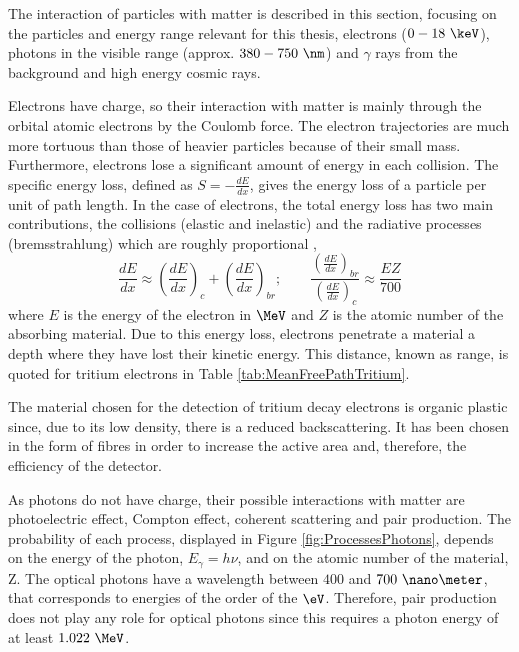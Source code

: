 The interaction of particles with matter is described in this section, focusing on the particles and energy range relevant for this thesis, electrons ($0-18~\keV$), photons in the visible range (approx. $380-750~\nm$) and $\gamma$ rays from the background and high energy cosmic rays.

Electrons have charge, so their interaction with matter is mainly through the orbital atomic  electrons by the Coulomb force. The electron trajectories are much more tortuous than those of heavier particles because of their small mass. Furthermore, electrons lose a significant amount of energy in each collision. The specific energy loss, defined as $S=-\displaystyle{\frac{dE}{dx}}$, gives the energy loss of a particle per unit of path length. In the case of electrons, the total energy loss has two main contributions, the collisions (elastic and inelastic) and the radiative processes (bremsstrahlung) which are roughly proportional \cite{Knoll, Leo},
\begin{equation}
\frac{dE}{dx} \approx \left(\frac{dE}{dx}\right)_{c} + \left(\frac{dE}{dx}\right)_{br} ; \qquad \frac{\displaystyle{\left(\frac{dE}{dx}\right)_{br}}}{\displaystyle{\left(\frac{dE}{dx}\right)_{c}}} \approx \frac{EZ}{700}
\label{eq:ElectronInteraction}
\end{equation}
where $E$ is the energy of the electron in $\MeV$ and $Z$ is the atomic number of the absorbing material. Due to this energy loss, electrons penetrate a material a depth where they have lost their kinetic energy. This distance, known as range, is quoted for tritium electrons in Table \ref{tab:MeanFreePathTritium}. 

The material chosen for the detection of tritium decay electrons is organic plastic since, due to its low density, there is a reduced backscattering. It has been chosen in the form of fibres in order to increase the active area and, therefore, the efficiency of the detector.

As photons do not have charge, their possible interactions with matter are photoelectric effect, Compton effect, coherent scattering and pair production. The probability of each process, displayed in Figure \ref{fig:ProcessesPhotons}, depends on the energy of the photon, $E_\gamma = h\nu$, and on the atomic number of the material, Z. The optical photons have a wavelength between $400$ and $700~\nano\meter$, that corresponds to energies of the order of the $\eV$. Therefore, pair production does not play any role for optical photons since this requires a photon energy of at least $1.022~\MeV$.

